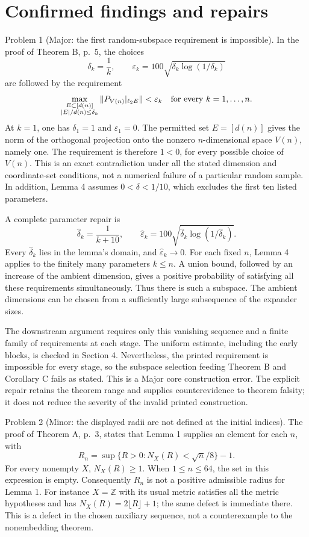 \documentclass[10pt]{article}
\begin{document}
\section*{Confirmed findings and repairs}
Problem 1 (Major: the first random-subspace requirement is impossible).  In the proof of Theorem B, p. 5, the choices \[\delta_k=\frac1k,\qquad
 \varepsilon_k=100\sqrt{\delta_k\log(1/\delta_k)}\] are followed by the requirement \[\max_{\substack{E\subset[d(n)]\\ |E|/d(n)\le\delta_k}}
       \|P_{V(n)}|_{\ell_2E}\|<\varepsilon_k
 \quad\hbox{for every }k=1,\ldots,n.\] At \(k=1\), one has \(\delta_1=1\) and \(\varepsilon_1=0\). The permitted set \(E=[d(n)]\) gives the norm of the orthogonal projection onto the nonzero \(n\)-dimensional space \(V(n)\), namely one. The requirement is therefore \(1<0\), for every possible choice of \(V(n)\). This is an exact contradiction under all the stated dimension and coordinate-set conditions, not a numerical failure of a particular random sample. In addition, Lemma 4 assumes \(0<\delta<1/10\), which excludes the first ten listed parameters.\par
A complete parameter repair is \[\widehat\delta_k=\frac1{k+10},\qquad
 \widehat\varepsilon_k
 =100\sqrt{\widehat\delta_k\log(1/\widehat\delta_k)}.\] Every \(\widehat\delta_k\) lies in the lemma’s domain, and \(\widehat\varepsilon_k\to0\). For each fixed \(n\), Lemma 4 applies to the finitely many parameters \(k\le n\). A union bound, followed by an increase of the ambient dimension, gives a positive probability of satisfying all these requirements simultaneously. Thus there is such a subspace. The ambient dimensions can be chosen from a sufficiently large subsequence of the expander sizes.\par
The downstream argument requires only this vanishing sequence and a finite family of requirements at each stage. The uniform estimate, including the early blocks, is checked in Section 4. Nevertheless, the printed requirement is impossible for every stage, so the subspace selection feeding Theorem B and Corollary C fails as stated. This is a Major core construction error. The explicit repair retains the theorem range and supplies counterevidence to theorem falsity; it does not reduce the severity of the invalid printed construction.\par
Problem 2 (Minor: the displayed radii are not defined at the initial indices).  The proof of Theorem A, p. 3, states that Lemma 1 supplies an element for each \(n\), with \[R_n=\sup\{R>0:N_X(R)<\sqrt n/8\}-1.\] For every nonempty \(X\), \(N_X(R)\ge1\). When \(1\le n\le64\), the set in this expression is empty. Consequently \(R_n\) is not a positive admissible radius for Lemma 1. For instance \(X=\mathbb Z\) with its usual metric satisfies all the metric hypotheses and has \(N_X(R)=2\lfloor R\rfloor+1\); the same defect is immediate there. This is a defect in the chosen auxiliary sequence, not a counterexample to the nonembedding theorem.\par
\end{document}
